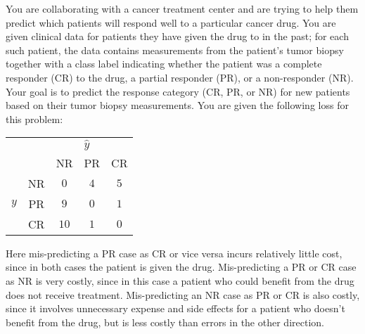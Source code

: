\begin{enumerate}
You are collaborating with a cancer treatment center and are trying to help them predict which patients will respond well to a particular cancer drug.
You are given clinical data for patients they have given the drug to in the past; for each such patient, the data contains measurements from the patient's tumor biopsy together with a class label indicating whether the patient was a complete responder (CR) to the drug, a partial responder (PR), or a non-responder (NR).
Your goal is to predict the response category (CR, PR, or NR) for new patients based on their tumor biopsy measurements.
You are given the following loss for this problem:
%
\begin{center}
\begin{tabular}{cc|ccc}
\multicolumn{3}{c}{} & \multicolumn{2}{l}{$\hat{y}$} \\[2pt]
 & & NR & PR & CR \\
 \cline{2-5}
 & NR & $0$ & $4$ & $5$ \\
$y$ & PR & $9$ & $0$ & $1$ \\
 & CR & $10$ & $1$ & $0$ \\
\end{tabular}
\end{center}
%
Here mis-predicting a PR case as CR or vice versa incurs relatively little cost, since in both cases the patient is given the drug. Mis-predicting a PR or CR case as NR is very costly, since in this case a patient who could benefit from the drug does not receive treatment. Mis-predicting an NR case as PR or CR is also costly, since it involves unnecessary expense and side effects for a patient who doesn't benefit from the drug, but is less costly than errors in the other direction. 


\end{enumerate}
